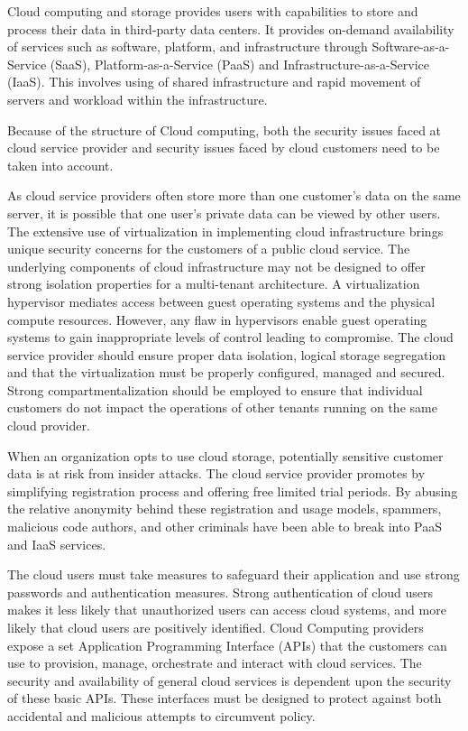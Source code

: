 \begin{multicols}{2}
Cloud computing and storage provides users with capabilities to store and process their data in third-party data centers. It provides on-demand availability of services such as software, platform, and infrastructure through Software-as-a-Service (SaaS), Platform-as-a-Service (PaaS) and Infrastructure-as-a-Service (IaaS). This involves using of shared infrastructure and rapid movement of servers and workload within the infrastructure. 

Because of the structure of Cloud computing, both the security issues faced at cloud service provider and security issues faced by cloud customers need to be taken into account.

As cloud service providers often store more than one customer's data on the same server, it is possible that one user's private data can be viewed by other users. The extensive use of virtualization in implementing cloud infrastructure brings unique security concerns for the customers of a public cloud service. The underlying components of cloud infrastructure may not be designed to offer strong isolation properties for a multi-tenant architecture. A virtualization hypervisor mediates access between guest operating systems and the physical compute resources. However, any flaw in hypervisors enable guest operating systems to gain inappropriate levels of control leading to compromise. The cloud service provider should ensure proper data isolation, logical storage segregation and that the virtualization must be properly configured, managed and secured. Strong compartmentalization should be employed to ensure that individual customers do not impact the operations of other tenants running on the same cloud provider.

When an organization opts to use cloud storage, potentially sensitive customer data is at risk from insider attacks. The cloud service provider promotes by simplifying registration process and offering free limited trial periods. By abusing the relative anonymity behind these registration and usage models, spammers, malicious code authors, and other criminals have been able to break into PaaS and IaaS services. 

The cloud users must take measures to safeguard their application and use strong passwords and authentication measures. Strong authentication of cloud users makes it less likely that unauthorized users can access cloud systems, and more likely that cloud users are positively identified. Cloud Computing providers expose a set Application Programming Interface (APIs) that the customers can use to provision, manage, orchestrate and interact with cloud services. The security and availability of general cloud services is dependent upon the security of these basic APIs. These interfaces must be designed to protect against both accidental and malicious attempts to circumvent policy.


\end{multicols}
